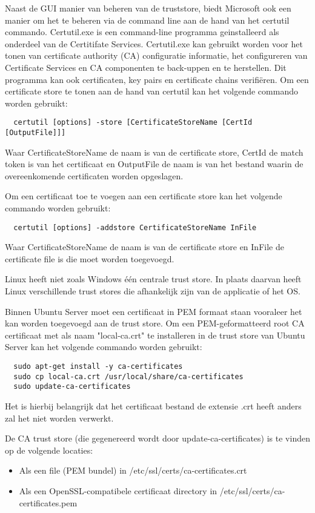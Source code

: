 Naast de GUI manier van beheren van de truststore, biedt Microsoft ook een manier om het te beheren via de command line aan de hand van het certutil commando.
Certutil.exe is een command-line programma geinstalleerd als onderdeel van de Certitifate Services. Certutil.exe kan gebruikt worden voor het tonen van certificate authority (CA) configuratie informatie, het configureren van Certificate Services en CA componenten te back-uppen en te herstellen.
Dit programma kan ook certificaten, key pairs en certificate chains verifiëren. \autocite{MScertutil}
Om een certificate store te tonen aan de hand van certutil kan het volgende commando worden gebruikt:
\begin{verbatim}
  certutil [options] -store [CertificateStoreName [CertId [OutputFile]]]
\end{verbatim}
Waar CertificateStoreName de naam is van de certificate store, CertId de match token is van het certificaat en OutputFile de naam is van het bestand waarin de overeenkomende certificaten worden opgeslagen. \autocite{MScertutil}

Om een certificaat toe te voegen aan een certificate store kan het volgende commando worden gebruikt:
\begin{verbatim}
  certutil [options] -addstore CertificateStoreName InFile
\end{verbatim}
Waar CertificateStoreName de naam is van de certificate store en InFile de certificate file is die moet worden toegevoegd. \autocite{MScertutil}

Linux heeft niet zoals Windows één centrale trust store. In plaats daarvan heeft Linux verschillende trust stores die afhankelijk zijn van de applicatie of het OS.

Binnen Ubuntu Server moet een certificaat in PEM formaat staan vooraleer het kan worden toegevoegd aan de trust store.
Om een PEM-geformatteerd root CA certificaat met als naam "local-ca.crt" te installeren in de trust store van Ubuntu Server kan het volgende commando worden gebruikt:
\begin{verbatim}
  sudo apt-get install -y ca-certificates
  sudo cp local-ca.crt /usr/local/share/ca-certificates
  sudo update-ca-certificates
\end{verbatim}

Het is hierbij belangrijk dat het certificaat bestand de extensie .crt heeft anders zal het niet worden verwerkt.

De CA trust store (die gegenereerd wordt door update-ca-certificates) is te vinden op de volgende locaties:
\begin{itemize}
  \item Als een file (PEM bundel) in /etc/ssl/certs/ca-certificates.crt
  \item Als een OpenSSL-compatibele certificaat directory in /etc/ssl/certs/ca-certificates.pem
\end{itemize} \autocite{UbunTruststore}
\break

